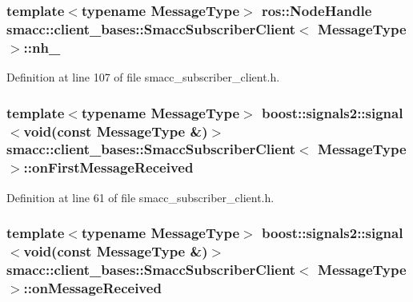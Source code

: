 \subsubsection[{\texorpdfstring{nh\+\_\+}{nh_}}]{\setlength{\rightskip}{0pt plus 5cm}template$<$typename Message\+Type$>$ ros\+::\+Node\+Handle {\bf smacc\+::client\+\_\+bases\+::\+Smacc\+Subscriber\+Client}$<$ Message\+Type $>$\+::nh\+\_\+\hspace{0.3cm}{\ttfamily [protected]}}\hypertarget{classsmacc_1_1client__bases_1_1SmaccSubscriberClient_a401d2476e89e27acc2e905acd701f053}{}\label{classsmacc_1_1client__bases_1_1SmaccSubscriberClient_a401d2476e89e27acc2e905acd701f053}


Definition at line 107 of file smacc\+\_\+subscriber\+\_\+client.\+h.

\subsubsection[{\texorpdfstring{on\+First\+Message\+Received}{onFirstMessageReceived}}]{\setlength{\rightskip}{0pt plus 5cm}template$<$typename Message\+Type$>$ boost\+::signals2\+::signal$<$void(const Message\+Type \&)$>$ {\bf smacc\+::client\+\_\+bases\+::\+Smacc\+Subscriber\+Client}$<$ Message\+Type $>$\+::on\+First\+Message\+Received}\hypertarget{classsmacc_1_1client__bases_1_1SmaccSubscriberClient_adaa280a70b97bd2c53d05b5712cbd701}{}\label{classsmacc_1_1client__bases_1_1SmaccSubscriberClient_adaa280a70b97bd2c53d05b5712cbd701}


Definition at line 61 of file smacc\+\_\+subscriber\+\_\+client.\+h.

\subsubsection[{\texorpdfstring{on\+Message\+Received}{onMessageReceived}}]{\setlength{\rightskip}{0pt plus 5cm}template$<$typename Message\+Type$>$ boost\+::signals2\+::signal$<$void(const Message\+Type \&)$>$ {\bf smacc\+::client\+\_\+bases\+::\+Smacc\+Subscriber\+Client}$<$ Message\+Type $>$\+::on\+Message\+Received}\hypertarget{classsmacc_1_1client__bases_1_1SmaccSubscriberClient_a2703867f1ee638c5fffa680f93cee29a}{}\label{classsmacc_1_1client__bases_1_1SmaccSubscriberClient_a2703867f1ee638c5fffa680f93cee29a}


